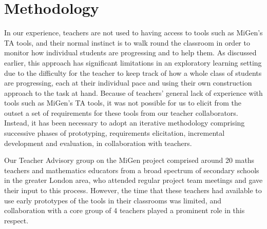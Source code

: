 \section{Methodology}
\label{sec:methodology}

In our experience, teachers are not used to having access to tools
such as MiGen's TA tools, and their normal instinct is to walk
round the classroom in order to monitor how individual 
students are progressing and to help them.  
As discussed earlier,
this approach has significant limitations in an exploratory learning setting
due to the difficulty for the teacher 
to keep track of how a whole class of students are progressing, 
each at their individual pace and using their own
construction approach to the task at hand. Because of teachers'
general lack of experience with tools such as MiGen's TA tools, 
it was not possible for us to elicit from the outset a set of requirements 
for these tools from our teacher collaborators. Instead, it has been
necessary to adopt an iterative methodology comprising
successive phases of prototyping, requirements elicitation,
incremental development and evaluation, in collaboration with teachers. 



Our Teacher Advisory group on the MiGen project comprised around 
20 maths teachers and mathematics educators
from a broad spectrum of secondary schools in the greater London area,
who attended regular project team meetings and gave their input to this 
process. However, the time that these teachers had
available to use early prototypes of the tools in their classrooms was
limited, and collaboration with a core group of 4 teachers
played a prominent role in this respect. 
 
